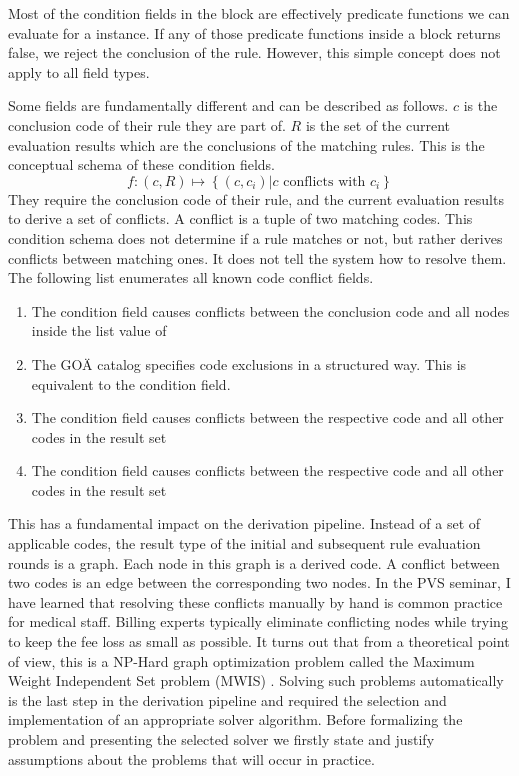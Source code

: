 Most of the condition fields in the  block are effectively predicate functions we can evaluate for a \REI instance.
If any of those predicate functions inside a  block returns false, we reject the conclusion of the rule.
However, this simple concept does not apply to all field types.

Some fields are fundamentally different and can be described as follows.
$c$ is the conclusion code of their rule they are part of.
$R$ is the set of the current evaluation results which are the conclusions of the matching rules.
This is the conceptual schema of these condition fields.
\[
    f: \left( c, R \right) \mapsto \left\{ \left( c, c_i \right) \lvert c \text{ conflicts with } c_i \right\}
\]
They require the conclusion code of their rule, and the current evaluation results to derive a set of conflicts.
A conflict is a tuple of two matching codes.
This condition schema does not determine if a rule matches or not, but rather derives conflicts between matching ones.
It does not tell the system how to resolve them.
The following list enumerates all known code conflict fields.
\begin{enumerate}
    \item The condition field  causes conflicts between the conclusion code and all nodes inside the list value of 
    \item The GOÄ catalog specifies code exclusions in a structured way.
    This is equivalent to the  condition field.
    \item The condition field  causes conflicts between the respective code and all other codes in the result set
    \item The condition field  causes conflicts between the respective code and all other codes in the result set
\end{enumerate}

This has a fundamental impact on the derivation pipeline.
Instead of a set of applicable codes, the result type of the initial and subsequent rule evaluation rounds is a graph.
Each node in this graph is a derived code.
A conflict between two codes is an edge between the corresponding two nodes.
In the PVS seminar, I have learned that resolving these conflicts manually by hand is common practice for medical staff.
Billing experts typically eliminate conflicting nodes while trying to keep the fee loss as small as possible.
It turns out that from a theoretical point of view, this is a NP-Hard graph optimization problem called the Maximum Weight Independent Set problem
(MWIS) \cite{SAKAI2003313}.
Solving such problems automatically is the last step in the derivation pipeline
and required the selection and implementation of an appropriate solver algorithm.
Before formalizing the problem and presenting the selected solver we firstly state
and justify assumptions about the problems that will occur in practice.


